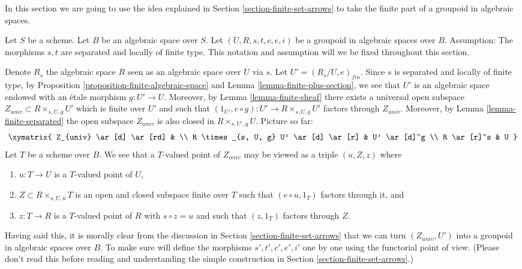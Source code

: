 \noindent
In this section we are going to use the idea explained in
Section \ref{section-finite-set-arrows}
to take the finite part of a groupoid in algebraic spaces.

\medskip\noindent
Let $S$ be a scheme.
Let $B$ be an algebraic space over $S$.
Let $(U, R, s, t, c, e, i)$ be a groupoid in algebraic spaces over $B$.
Assumption: The morphisms $s, t$ are separated and locally of finite type.
This notation and assumption will we be fixed throughout this section.

\medskip\noindent
Denote $R_s$ the algebraic space $R$ seen as an
algebraic space over $U$ via $s$. Let
$U' = (R_s/U, e)_{fin}$. Since $s$ is separated and locally of
finite type, by
Proposition \ref{proposition-finite-algebraic-space} and
Lemma \ref{lemma-finite-plus-section},
we see that $U'$ is an algebraic space endowed with an \'etale morphism
$g : U' \to U$. Moreover, by
Lemma \ref{lemma-finite-sheaf}
there exists a universal open subspace
$Z_{univ} \subset R \times_{s, U, g} U'$ which is finite over $U'$
and such that $(1_{U'}, e \circ g) : U' \to R \times_{s, U, g} U'$
factors through $Z_{univ}$. Moreover, by
Lemma \ref{lemma-finite-separated}
the open subspace $Z_{univ}$ is also closed in $R \times_{s, U', g} U$.
Picture so far:
$$
\xymatrix{
Z_{univ} \ar[d] \ar[rd] & \\
R \times_{s, U, g} U' \ar[d] \ar[r] & U' \ar[d]^g \\
R \ar[r]^s & U
}
$$
Let $T$ be a scheme over $B$. We see that a $T$-valued point of
$Z_{univ}$ may be viewed as a triple $(u, Z, z)$ where
\begin{enumerate}
\item $u : T \to U$ is a $T$-valued point of $U$,
\item $Z \subset R \times_{s, U, u} T$ is an open and closed subspace
finite over $T$ such that $(e \circ u, 1_T)$ factors through it, and
\item $z : T \to R$ is a $T$-valued point of $R$ with $s \circ z = u$
and such that $(z, 1_T)$ factors through $Z$.
\end{enumerate}
Having said this, it is morally clear from the discussion in
Section \ref{section-finite-set-arrows}
that we can turn $(Z_{univ}, U')$ into a groupoid in algebraic spaces
over $B$. To make sure will define the morphisms $s', t', c', e', i'$
one by one using the functorial point of view. (Please don't read this
before reading and understanding the simple construction in
Section \ref{section-finite-set-arrows}.)

